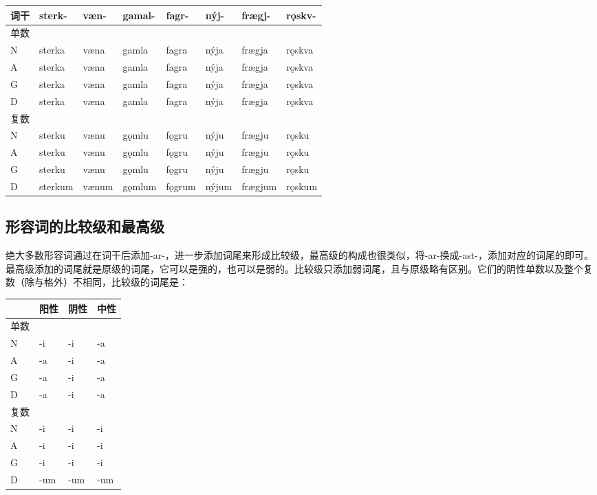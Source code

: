 \begin{longtable}{llllllll}
\toprule
词干 & sterk- & væn- & gamal- & fagr- & nýj- & frægj- & rǫskv- \\
\midrule
\endhead
\bottomrule
\endfoot
单数 & & & & & & & \\
N & sterka & væna & gamla & fagra & nýja & frægja & rǫskva \\
A & sterka & væna & gamla & fagra & nýja & frægja & rǫskva \\
G & sterka & væna & gamla & fagra & nýja & frægja & rǫskva \\
D & sterka & væna & gamla & fagra & nýja & frægja & rǫskva \\
复数 & & & & & & & \\
N & sterku & vænu & gǫmlu & fǫgru & nýju & frægju & rǫsku \\
A & sterku & vænu & gǫmlu & fǫgru & nýju & frægju & rǫsku \\
G & sterku & vænu & gǫmlu & fǫgru & nýju & frægju & rǫsku \\
D & sterkum & vænum & gǫmlum & fǫgrum & nýjum & frægjum & rǫskum \\
\end{longtable}

\subsection{形容词的比较级和最高级}\label{ux5f62ux5bb9ux8bcdux7684ux6bd4ux8f83ux7ea7ux548cux6700ux9ad8ux7ea7}

绝大多数形容词通过在词干后添加-ar-，进一步添加词尾来形成比较级，最高级的构成也很类似，将-ar-换成-ast-，添加对应的词尾的即可。最高级添加的词尾就是原级的词尾，它可以是强的，也可以是弱的。比较级只添加弱词尾，且与原级略有区别。它们的阴性单数以及整个复数（除与格外）不相同，比较级的词尾是：

\begin{longtable}{llll}
\toprule
 & 阳性 & 阴性 & 中性 \\
\midrule
\endhead
\bottomrule
\endfoot
单数 & & & \\
N & -i & -i & -a \\
A & -a & -i & -a \\
G & -a & -i & -a \\
D & -a & -i & -a \\
复数 & & & \\
N & -i & -i & -i \\
A & -i & -i & -i \\
G & -i & -i & -i \\
D & -um & -um & -um \\
\end{longtable}

